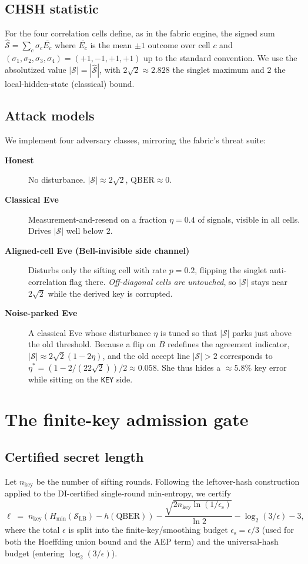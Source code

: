\documentclass[11pt,a4paper]{article}
\newcommand{\CHSH}{\mathcal{S}}
\newcommand{\eps}{\epsilon}
\newcommand{\epsS}{\eps_{\mathrm{s}}}
\newcommand{\QBER}{\mathrm{QBER}}
\newcommand{\Hmin}{H_{\min}}
\newcommand{\SLB}{\mathcal{S}_{\mathrm{LB}}}
\newcommand{\bits}{\ell}
\newcommand{\bell}{2\sqrt{2}}
\theoremstyle{plain}
\theoremstyle{definition}
\begin{document}
\subsection{CHSH statistic}
For the four correlation cells define, as in the fabric engine, the signed
sum $\widehat{\CHSH} = \sum_c \sigma_c \overline{E_c}$ where
$\overline{E_c}$ is the mean $\pm1$ outcome over cell $c$ and
$(\sigma_1,\sigma_2,\sigma_3,\sigma_4) = (+1,-1,+1,+1)$ up to the standard
convention. We use the absolutized value $|\CHSH| = |\widehat{\CHSH}|$, with
$\bell \approx 2.828$ the singlet maximum and $2$ the local-hidden-state
(classical) bound.

\subsection{Attack models}
We implement four adversary classes, mirroring the fabric's threat suite:
\begin{description}
  \item[\textbf{Honest}] No disturbance. $|\CHSH|\approx\bell$, $\QBER\approx0$.
  \item[\textbf{Classical Eve}] Measurement-and-resend on a fraction $\eta=0.4$
    of signals, visible in all cells. Drives $|\CHSH|$ well below $2$.
  \item[\textbf{Aligned-cell Eve (Bell-invisible side channel)}] Disturbs only
    the sifting cell with rate $p=0.2$, flipping the singlet anti-correlation
    flag there. \emph{Off-diagonal cells are untouched}, so $|\CHSH|$ stays near
    $\bell$ while the derived key is corrupted.
  \item[\textbf{Noise-parked Eve}] A classical Eve whose disturbance $\eta$ is
    tuned so that $|\CHSH|$ parks just above the old threshold. Because a flip
    on $B$ redefines the agreement indicator, $|\CHSH|\approx\bell(1-2\eta)$,
    and the old accept line $|\CHSH|>2$ corresponds to
    $\eta^{\ast} = (1 - 2/(\!2\bell\!))/2 \approx 0.058$. She thus hides a
    $\approx 5.8\%$ key error while sitting on the \texttt{KEY} side.
\end{description}

\section{The finite-key admission gate}\label{sec:gate}
\subsection{Certified secret length}
Let $n_{\mathrm{key}}$ be the number of sifting rounds. Following the
leftover-hash construction \citep{leftoverhash} applied to the DI-certified
single-round min-entropy, we certify
\begin{equation}
\bits \;=\; n_{\mathrm{key}}\!\left(\Hmin(\SLB)-h(\QBER)\right)
-\frac{\sqrt{2 n_{\mathrm{key}} \ln(1/\epsS)}}{\ln 2}
-\log_2(3/\eps) - 3,
\label{eq:bits}
\end{equation}
where the total $\eps$ is split into the finite-key/smoothing budget
$\epsS = \eps/3$ (used for both the Hoeffding union bound and the AEP term)
and the universal-hash budget (entering $\log_2(3/\eps)$).
\end{document}
